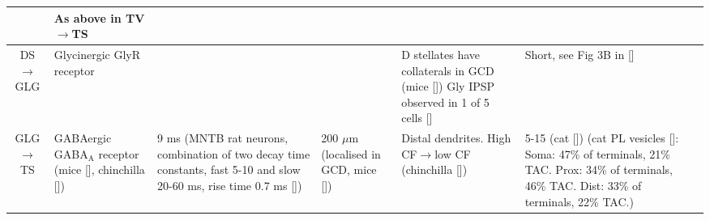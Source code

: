 \begin{longtable}{cYYYYYY}
                                & 
As above in TV\ensuremath{\rightarrow}TS
\\ \midrule
DS\ensuremath{\rightarrow}GLG                                 
                                & 
Glycinergic GlyR receptor                  
                                & %
                                & 
                                & 
D stellates have collaterals in GCD (mice [])
Gly IPSP observed in 1 of 5 cells []    
                                & %
Short, see Fig 3B in []
\\ \midrule
GLG\ensuremath{\rightarrow}TS                         
                                & %
GABAergic GABA$_{\textrm{A}}$ receptor  (mice [], chinchilla [])
                                & %
 9 ms  (MNTB rat neurons, combination of two decay time constants, fast 5-10 and slow 20-60 ms, rise time 0.7 ms [])

                                & %
200 $\mu$m (localised in GCD, mice [])
                                & %
Distal dendrites.
High CF\ensuremath{\rightarrow}low CF (chinchilla [])                        
                                & %
5-15 (cat [])     
(cat PL vesicles []:
Soma: 47\% of terminals, 21\% TAC. 
Prox: 34\% of terminals, 46\% TAC. 
Dist: 33\% of terminals, 22\% TAC.)


\end{longtable}
